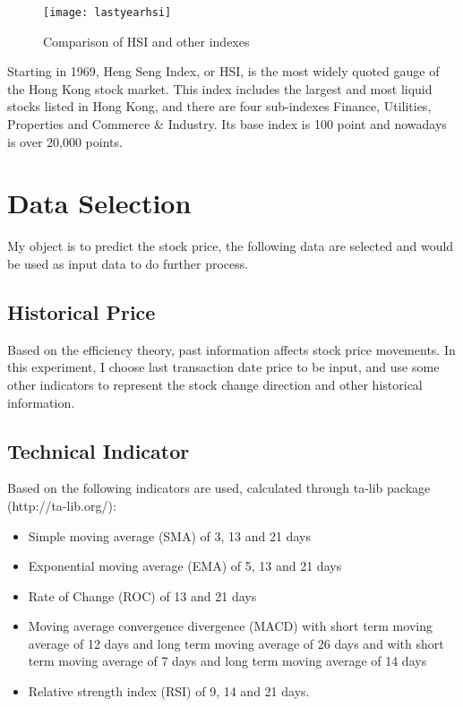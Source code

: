 \begin{figure}[h]
	\centering
	\texttt{[image: lastyearhsi]}
	\caption{Comparison of HSI and other indexes}
\end{figure}

Starting in 1969, Heng Seng Index, or HSI, is the most widely quoted gauge of the Hong Kong stock market\cite{hsi_company_profile}. This index includes the largest and most liquid stocks listed in Hong Kong, and there are four sub-indexes Finance, Utilities, Properties and Commerce \& Industry\cite{heng_seng_index}. Its base index is 100 point and nowadays is over 20,000 points.

\section{Data Selection}

My object is to predict the stock price, the following data are selected and would be used as input data to do further process. 

\subsection{Historical Price}
Based on the efficiency theory, past information affects stock price movements. In this experiment, I choose last transaction date price to be input, and use some other indicators to represent the stock change direction and other historical information.

\subsection{Technical Indicator}

Based on \cite{lauretto2013evaluation} the following indicators are used, calculated through ta-lib package (http://ta-lib.org/):
\begin{itemize}
	\item Simple moving average (SMA) of 3, 13 and 21 days
	\item Exponential moving average (EMA) of 5, 13 and 21 days
	\item Rate of Change (ROC) of 13 and 21 days
	\item Moving average convergence divergence (MACD) with short term moving average of 12 days and long term moving average of 26 days and with short term moving average of 7 days and long term moving average of 14 days
	\item Relative strength index (RSI) of 9, 14 and 21 days.
\end{itemize}


